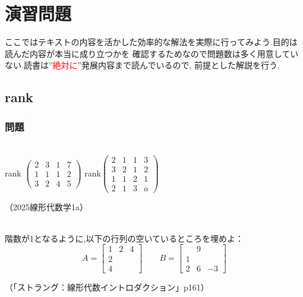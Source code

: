 \section{演習問題}
ここではテキストの内容を活かした効率的な解法を実際に行ってみよう.目的は読んだ内容が本当に成り立つかを
確認するためなので問題数は多く用意していない.読書は”\textcolor{red}{絶対に}”発展内容まで読んでいるので,
前提とした解説を行う.\\
\subsection{rank}
\subsubsection{問題}
\noindent
{}\\
rank
$\begin{pmatrix}
    2 & 3 & 1 & 7 \\
    1 & 1 & 1 & 2 \\
    3 & 2 & 4 & 5
\end{pmatrix}$ \hspace{1cm}
rank$\begin{pmatrix}
    2 & 1 & 1 & 3 \\
    3 & 2 & 1 & 2 \\
    1 & 1 & 2 & 1 \\
    2 & 1 & 3 & a
\end{pmatrix}$\\
\begin{flushright}
    （2025線形代数学1a）
\end{flushright}
\\
階数が1となるように,以下の行列の空いているところを埋めよ：
\[
A=
\begin{bmatrix}
    1 & 2 & 4 \\
    2 & & \\
    4 & & 
\end{bmatrix} \qquad
B=
\begin{bmatrix}
    & 9 &  \\
    1 & & \\
    2 & 6 & -3
\end{bmatrix}
\]
\begin{flushright}
    （「ストラング：線形代数イントロダクション」p161）
\end{flushright}
